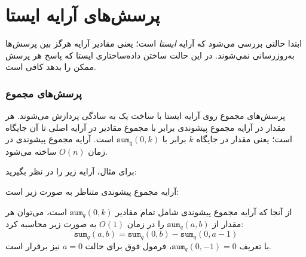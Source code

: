 \section{پرسش‌های آرایه ایستا}

ابتدا حالتی بررسی می‌شود که
آرایه \emph{ایستا} است؛ یعنی
مقادیر آرایه هرگز بین پرسش‌ها به‌روزرسانی نمی‌شوند.
در این حالت ساختن داده‌ساختاری ایستا
که پاسخ هر پرسش ممکن را بدهد کافی است.

\subsubsection{پرسش‌های مجموع}


پرسش‌های مجموع روی آرایه ایستا
با ساخت یک  به سادگی پردازش می‌شوند.
هر مقدار در آرایه مجموع پیشوندی برابر با
مجموع مقادیر در آرایه اصلی تا آن جایگاه است؛
یعنی مقدار در جایگاه $k$ برابر با $\texttt{sum}_q(0,k)$ است.
آرایه مجموع پیشوندی در زمان $O(n)$ ساخته می‌شود.

برای مثال، آرایه زیر را در نظر بگیرید:
\begin{center}
\end{center}
آرایه مجموع پیشوندی متناظر به صورت زیر است:
\begin{center}
\end{center}
از آنجا که آرایه مجموع پیشوندی شامل تمام مقادیر
$\texttt{sum}_q(0,k)$ است،
می‌توان هر مقدار از
$\texttt{sum}_q(a,b)$ را در زمان $O(1)$ به صورت زیر محاسبه کرد:
\[ \texttt{sum}_q(a,b) = \texttt{sum}_q(0,b) - \texttt{sum}_q(0,a-1)\]
با تعریف $\texttt{sum}_q(0,-1)=0$،
فرمول فوق برای حالت $a=0$ نیز برقرار است.

